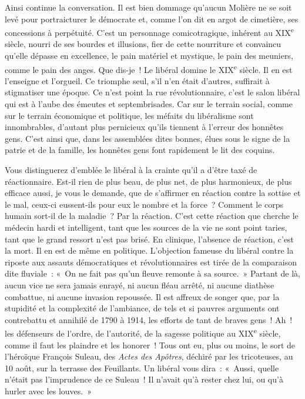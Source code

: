 \documentclass[french,twoside]{book} %
\begin{document}
Ainsi continue la conversation. Il est bien dommage qu’aucun Molière ne se soit levé pour portraicturer le démocrate et, comme l’on dit en argot de cimetière, ses concessions à perpétuité. C’est un personnage comicotragique, inhérent au XIX\textsuperscript{e} siècle, nourri de ses bourdes et illusions, fier de cette nourriture et convaincu qu’elle dépasse en excellence, le pain matériel et mystique, le pain des meuniers, comme le pain des anges. Que dis-je ! Le libéral domine le XIX\textsuperscript{e} siècle. Il en est l’enseigne et l’orgueil. Ce triomphe seul, s’il n’en était d’autres, suffirait à stigmatiser une époque. Ce n’est point la rue révolutionnaire, c’est le salon libéral qui est à l’aube des émeutes et septembrisades. Car sur le terrain social, comme sur le terrain économique et politique, les méfaits du libéralisme sont innombrables, d’autant plus pernicieux qu’ils tiennent à l’erreur des honnêtes gens. C’est ainsi que, dans les assemblées dites bonnes, élues sous le signe de la patrie et de la famille, les honnêtes gens font rapidement le lit des coquins.\par
Vous distinguerez d’emblée le libéral à la crainte qu’il a d’être taxé de réactionnaire. Est-il rien de plus beau, de plus net, de plus harmonieux, de plus efficace aussi, je vous le demande, que de s’affirmer en réaction contre la sottise et le mal, ceux-ci eussent-ils pour eux le nombre et la force ? Comment le corps humain sort-il de la maladie ? Par la réaction. C’est cette réaction que cherche le médecin hardi et intelligent, tant que les sources de la vie ne sont point taries, tant que le grand ressort n’est pas brisé. En clinique, l’absence de réaction, c’est la mort. Il en est de même en politique. L’objection fameuse du libéral contre la riposte aux assauts démocratiques et révolutionnaires est tirée de la comparaison dite fluviale : « On ne fait pas qu’un fleuve remonte à sa source. » Partant de là, aucun vice ne sera jamais enrayé, ni aucun fléau arrêté, ni aucune diathèse combattue, ni aucune invasion repoussée. Il est affreux de songer que, par la stupidité et la complexité de l’ambiance, de tels et si pauvres arguments ont contrebattu et annihilé de 1790 à 1914, les efforts de tant de braves gens ! Ah ! les défenseurs de l’ordre, de l’autorité, de la sagesse politique au XIX\textsuperscript{e} siècle, comme il faut les plaindre et les honorer ! Tous ont eu, plus ou moins, le sort de l’héroïque François Suleau, des {\itshape Actes des Apôtres}, déchiré par les tricoteuses, au 10 août, sur la terrasse des Feuillants. Un libéral vous dira : « Aussi, quelle n’était pas l’imprudence de ce Suleau ! Il n’avait qu’à rester chez lui, ou qu’à hurler avec les louves. »\par
\end{document}
